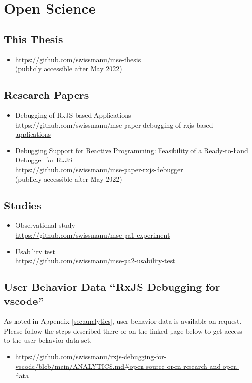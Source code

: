 \cleardoublepage







\section{Open Science \label{sec:open-science}}

\subsection*{This Thesis}
\begin{itemize}
  \item \url{https://github.com/swissmanu/mse-thesis} \\ (publicly accessible after May 2022)
\end{itemize}

\subsection*{Research Papers}
\begin{itemize}
  \item Debugging of RxJS-based Applications \\ \url{https://github.com/swissmanu/mse-paper-debugging-of-rxjs-based-applications}
  \item Debugging Support for Reactive Programming: Feasibility of a Ready-to-hand Debugger for RxJS \\ \url{https://github.com/swissmanu/mse-paper-rxjs-debugger} \\ (publicly accessible after May 2022)
\end{itemize}

\subsection*{Studies}
\begin{itemize}
  \item Observational study \\ \url{https://github.com/swissmanu/mse-pa1-experiment}
  \item Usability test \\ \url{https://github.com/swissmanu/mse-pa2-usability-test}
\end{itemize}

\subsection*{User Behavior Data ``RxJS Debugging for vscode''}

As noted in Appendix \ref{sec:analytics}, user behavior data is available on request. Please follow the steps described there or on the linked page below to get access to the user behavior data set.

\begin{itemize}
  \item \url{https://github.com/swissmanu/rxjs-debugging-for-vscode/blob/main/ANALYTICS.md\#open-source-open-research-and-open-data}
\end{itemize}
